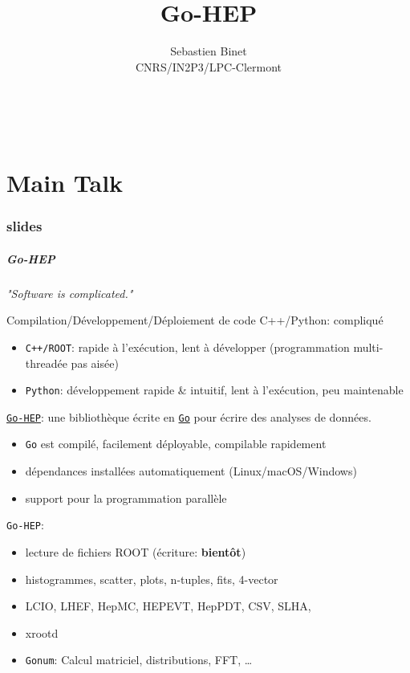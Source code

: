 \documentclass[9pt]{beamer}
\title[Go-HEP]{Go-HEP}
\author[Sebastien Binet]{
 \parbox{0.26\textwidth}{
	\texorpdfstring
	  {
		\centering
 		Sebastien Binet \\
 		CNRS/IN2P3/LPC-Clermont \\
 		\myblue{\href{https://github.com/sbinet}{\texttt{https://github.com/sbinet}}} \\
 		\myblue{\href{http://twitter.com/0xbins}{\texttt{@0xbins}}} \\
 		\myblue{\href{mailto:binet@cern.ch}{\texttt{binet@cern.ch}}} \\
 	  }
	{Sebastien Binet}
}
 }
\newcommand{\myblue} [1] {{\color{blue}#1}}
\begin{document}
\frame{\titlepage
}

\part<presentation>{Main Talk}

\section[slides]{slides}

\begin{frame}[fragile]
\frametitle{Go-HEP}


	\emph{"Software is complicated."}

Compilation/D\'eveloppement/D\'eploiement de code C++/Python: compliqu\'e

\begin{itemize}
\item \texttt{C++/ROOT}: rapide \`a l'ex\'ecution, lent \`a d\'evelopper (programmation multi-thread\'ee pas ais\'ee)
\item \texttt{Python}: d\'eveloppement rapide \& intuitif, lent \`a l'ex\'ecution, peu maintenable
\end{itemize}

\myblue{\href{https://go-hep.org}{\texttt{Go-HEP}}}: une biblioth\`eque \'ecrite en \myblue{\href{https://golang.org}{\texttt{Go}}} pour \'ecrire des analyses de donn\'ees.


\begin{itemize}
\item \texttt{Go} est compil\'e, facilement d\'eployable, compilable rapidement
\item d\'ependances install\'ees automatiquement (Linux/macOS/Windows)
\item support pour la programmation parall\`ele
\end{itemize}

\texttt{Go-HEP}:


\begin{itemize}
\item lecture de fichiers ROOT (\'ecriture: \textbf{bient\^ot})
\item histogrammes, scatter, plots, n-tuples, fits, 4-vector
\item LCIO, LHEF, HepMC, HEPEVT, HepPDT, CSV, SLHA, 
\item xrootd
\item \myblue{\texttt{Gonum}}: Calcul matriciel, distributions, FFT, \ldots
\end{itemize}


\end{frame}
\end{document}
